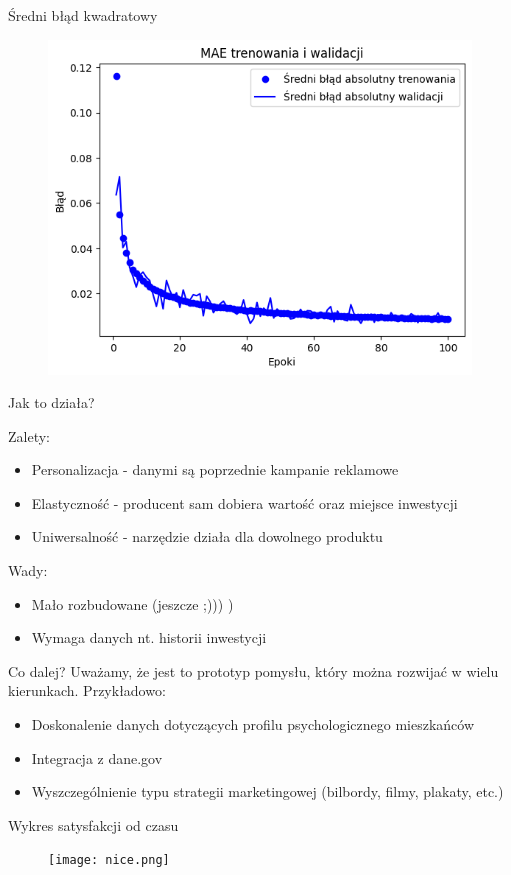 \documentclass{beamer}
\begin{document}
\begin{frame}{Średni błąd kwadratowy}
\begin{figure}
    \centering
    \includegraphics[width=0.7\linewidth]{mae.png}
\end{figure}
\end{frame}


\begin{frame}[t]{Jak to działa?}

{\Large Zalety:}
\vspace{0.5cm}
\begin{itemize}
    \item Personalizacja - danymi są poprzednie kampanie reklamowe
    \item Elastyczność - producent sam dobiera wartość oraz miejsce inwestycji
    \item Uniwersalność - narzędzie działa dla dowolnego produktu
\end{itemize}

\pause

\vspace{1cm}

{\Large Wady:}
\vspace{0.5cm}
\begin{itemize}
    \item Mało rozbudowane (jeszcze ;))) )
    \item Wymaga danych nt. historii inwestycji
\end{itemize}

\end{frame}

\begin{frame}{Co dalej?}
Uważamy, że jest to prototyp pomysłu, który można rozwijać w wielu kierunkach. Przykładowo:
\begin{itemize}
    \item Doskonalenie danych dotyczących profilu psychologicznego mieszkańców
    \item Integracja z dane.gov
    \item Wyszczególnienie typu strategii marketingowej (bilbordy, filmy, plakaty, etc.)
\end{itemize}

\end{frame}


\begin{frame}{Wykres satysfakcji od czasu}
\begin{figure}
    \centering
    \texttt{[image: nice.png]}
\end{figure}
\end{frame}
\end{document}
